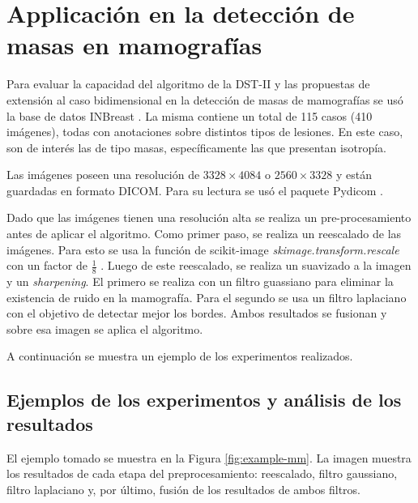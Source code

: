 \section{Applicación en la detección de masas en mamografías}

Para evaluar la capacidad del algoritmo de la DST-II y las propuestas de extensión al caso bidimensional en
la detección de masas de mamografías se usó la base de datos INBreast \cite{Moreira2012}. La misma 
contiene un total de 115 casos (410 imágenes), todas con anotaciones sobre distintos tipos de lesiones. 
En este caso, son de interés las de tipo masas, específicamente las que presentan isotropía.

Las imágenes poseen una resolución de $3328\times 4084$ o $2560\times 3328$ y están guardadas en formato
DICOM. Para su lectura se usó el paquete Pydicom \cite{darcy_mason_2020_4313150}.

Dado que las imágenes tienen una resolución alta se realiza un pre-procesamiento antes de aplicar el
algoritmo. Como primer paso, se realiza un reescalado de las imágenes. Para esto se usa la función de scikit-image
\textit{skimage.transform.rescale} con un factor de $\frac{1}{8}$ \cite{skimage-transform}. Luego de este reescalado,
se realiza un suavizado a la imagen y un \textit{sharpening}. El primero se realiza con un filtro guassiano
para eliminar la existencia de ruido en la mamografía. Para el segundo se usa un filtro laplaciano con el objetivo
de detectar mejor los bordes. Ambos resultados se fusionan y sobre esa imagen se aplica el algoritmo.

A continuación se muestra un ejemplo de los experimentos realizados.

\subsection{Ejemplos de los experimentos y análisis de los resultados}

El ejemplo tomado se muestra en la Figura \ref{fig:example-mm}. La imagen muestra los resultados de cada etapa 
del preprocesamiento: reescalado, filtro gaussiano, filtro laplaciano y, por último, fusión de los
resultados de ambos filtros.


